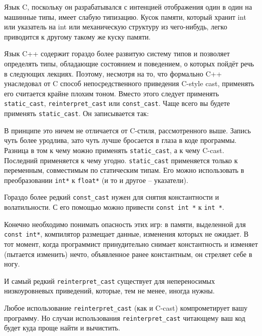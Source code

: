 \documentclass[a4paper,12pt,oneside]{article}
\begin{document}
Язык C, поскольку он разрабатывался с интенцией отображения один в один на машинные типы, имеет слабую типизацию. Кусок памяти, который хранит int или указатель на int или механическую структуру из чего-нибудь, легко приводится к другому такому же куску памяти.



Язык C++ содержит гораздо более развитую систему типов и позволяет определять типы, обладающие состоянием и поведением, о которых пойдёт речь в следующих лекциях. Поэтому, несмотря на то, что формально C++ унаследовал от C способ непосредственного приведения C-style cast, применять его считается крайне плохим тоном. Вместо этого следует применять \lstinline!static_cast!, \lstinline!reinterpret_cast! или \lstinline!const_cast!. Чаще всего вы будете применять \lstinline!static_cast!. Он записывается так:



В принципе это ничем не отличается от C-стиля, рассмотренного выше. Запись чуть более уродлива, зато чуть лучше бросается в глаза в коде программы. Разница в том к чему можно применять \lstinline!static_cast!, а к чему C-cast. Последний применяется к чему угодно. \lstinline!static_cast! применяется только к переменным, совместимым по статическим типам. Его можно использовать в преобразовании \lstinline!int*! к \lstinline!float*! (и то и другое – указатели). 

Гораздо более редкий \lstinline!const_cast! нужен для снятия константности и волатильности. С его помощью можно привести \lstinline!const int *! к \lstinline!int *!. 



Конечно необходимо понимать опасность этих игр: в памяти, выделенной для \lstinline!const int*!, компилятор размещает данные, изменения которых не ожидает. В тот момент, когда программист принудительно снимает константность и изменяет (пытается изменить) нечто, объявленное ранее константным, он стреляет себе в ногу.

И самый редкий \lstinline!reinterpret_cast! существует для непереносимых низкоуровневых приведений, которые, тем не менее, иногда нужны.



Любое использование \lstinline!reinterpret_cast! (как и C-cast) компрометирует вашу программу. Но случаи использования \lstinline!reinterpret_cast! читающему ваш код будет куда проще найти и вычистить.
\end{document}

